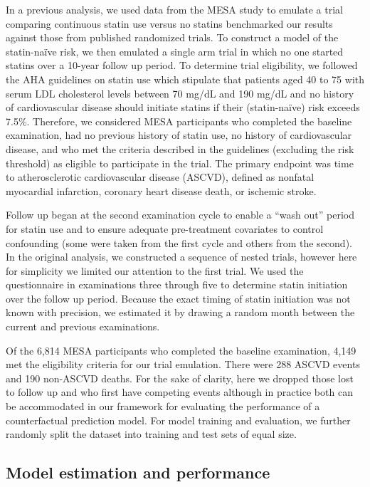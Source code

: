 In a previous analysis, we used data from the MESA study to emulate a trial comparing continuous statin use versus no statins benchmarked our results against those from published randomized trials. To construct a model of the statin-na\"{i}ve risk, we then emulated a single arm trial in which no one started statins over a 10-year follow up period. To determine trial eligibility, we followed the AHA guidelines \cite{grundy_scott_m_2018_2019} on statin use which stipulate that patients aged 40 to 75 with serum LDL cholesterol levels between 70 mg/dL and 190 mg/dL and no history of cardiovascular disease should initiate statins if their (statin-na\"{i}ve) risk exceeds 7.5\%. Therefore, we considered MESA participants who completed the baseline examination, had no previous history of statin use, no history of cardiovascular disease, and who met the criteria described in the guidelines (excluding the risk threshold) as eligible to participate in the trial. The primary endpoint was time to atherosclerotic cardiovascular disease (ASCVD), defined as nonfatal myocardial infarction, coronary heart disease death, or ischemic stroke. 

Follow up began at the second examination cycle to enable a ``wash out'' period for statin use and to ensure adequate pre-treatment covariates to control confounding (some were taken from the first cycle and others from the second). In the original analysis, we constructed a sequence of nested trials, however here for simplicity we limited our attention to the first trial. We used the questionnaire in examinations three through five to determine statin initiation over the follow up period. Because the exact timing of statin initiation was not known with precision, we estimated it by drawing a random month between the current and previous examinations. 

Of the 6,814 MESA participants who completed the baseline examination, 4,149 met the eligibility criteria for our trial emulation. There were 288 ASCVD events and 190 non-ASCVD deaths. For the sake of clarity, here we dropped those lost to follow up and who first have competing events although in practice both can be accommodated in our framework for evaluating the performance of a counterfactual prediction model. For model training and evaluation, we further randomly split the dataset into training and test sets of equal size. 

\subsection{Model estimation and performance}

